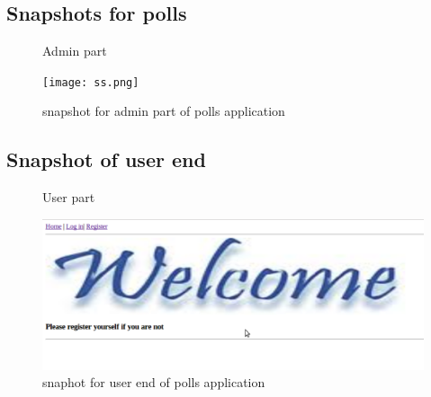 \subsection{Snapshots for polls}
\begin{figure}{Admin part}
\caption{snapshot for admin part of polls application}\label{imag}
\centering
\texttt{[image: ss.png]}
\end{figure}
\newpage
\subsection{Snapshot of user end}
\begin{figure}{User part}
\caption{snaphot for user end of polls application}\label{imag}
\centering
\includegraphics[scale=0.4]{screenshot.png}
\end{figure}


